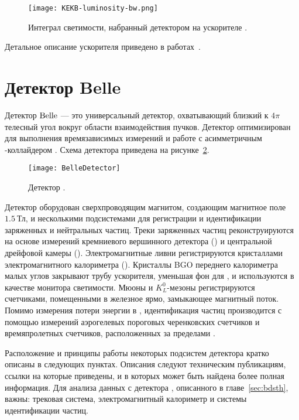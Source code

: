 \begin{figure}[htb]
 \centering
  \texttt{[image: KEKB-luminosity-bw.png]}
  \caption{Интеграл светимости, набранный детектором \belle на ускорителе \kekb.}
\label{fig:KEKB-lum}
\end{figure}

Детальное описание ускорителя \kekb приведено в работах~\cite{KEKB1,KEKB2}.

\clearpage
\section{Детектор Belle}\label{sec:belle}
Детектор $\mathrm{Belle}$ --- это универсальный детектор, охватывающий близкий к $4\pi$ телесный угол вокруг области взаимодействия пучков.  Детектор оптимизирован для выполнения времязависимых  измерений и работе с асимметричным \ep-коллайдером \kekb.  Схема детектора приведена на рисунке~\ref{fig:Belle}.  

\begin{figure}[htb]
 \centering
  \texttt{[image: BelleDetector]}
  \caption{Детектор \belle.}
\label{fig:Belle}
\end{figure}

Детектор \belle оборудован сверхпроводящим магнитом, создающим магнитное поле $1.5~\textrm{Тл}$, и несколькими подсистемами для регистрации и идентификации заряженных и нейтральных частиц.  Треки заряженных частиц реконструируются на основе измерений кремниевого вершинного детектора (\svd) и центральной дрейфовой камеры (\cdc).  Электромагнитные ливни регистрируются кристаллами \csit электромагнитного калориметра (\ecl).  Кристаллы \textrm{BGO} переднего калориметра малых углов закрывают трубу ускорителя, уменьшая фон для \cdc, и используются в качестве монитора светимости.  Мюоны и $K_L^0$-мезоны регистрируются счетчиками, помещенными в железное ярмо, замыкающее магнитный поток.  Помимо измерения потери энергии в \cdc, идентификация частиц производится с помощью измерений аэрогелевых пороговых черенковских счетчиков и времяпролетных счетчиков, расположенных за пределами \cdc.



Расположение и принципы работы некоторых подсистем детектора \belle кратко описаны в следующих пунктах.  Описания следуют техническим публикациям, ссылки на которые приведены, и в которых может быть найдена более полная информация.  Для анализа данных с детектора \belle, описанного в главе~\ref{sec:bdsth}, важны: трековая система, электромагнитный калориметр и системы идентификации частиц.

